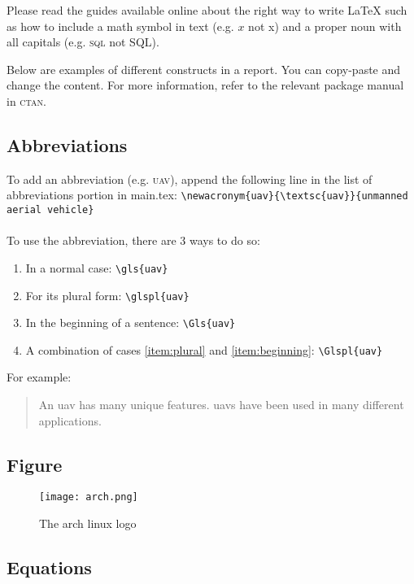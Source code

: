 \documentclass[../main.tex]{subfiles}
\begin{document}
Please read the guides available online about the right way
to write {\LaTeX} such as how to include a math symbol in
text (e.g. $x$ not x) and a proper noun with all capitals
(e.g. \textsc{sql} not SQL).

Below are examples of different constructs in a report. You
can copy-paste and change the content. For more information,
refer to the relevant package manual in \textsc{ctan}.

\subsection{Abbreviations}

To add an abbreviation (e.g. \textsc{uav}), 
append the following line 
in the list of abbreviations portion in main.tex:
\verb|\newacronym{uav}{\textsc{uav}}{unmanned aerial vehicle}|
\\\\
\noindent
To use the abbreviation, there are 3 ways to do so:
\begin{enumerate}
    \item In a normal case: \verb|\gls{uav}|
    \item\label{item:plural} For its plural form: \verb|\glspl{uav}|
    \item\label{item:beginning} In the beginning of a sentence: \verb|\Gls{uav}|
    \item A combination of cases \ref{item:plural} 
        and \ref{item:beginning}: \verb|\Glspl{uav}|
\end{enumerate}

\noindent
For example:
\begin{quotation}
    \noindent
    An \gls{uav} has many unique features. 
    \Glspl{uav} have been used in many different applications.
\end{quotation}

\subsection{Figure}

\begin{figure}[htb] 
    \centering
    \texttt{[image: arch.png]} 
    \caption{The arch linux logo} \label{fig:arch-linux} 
\end{figure}

\subsection{Equations}
\end{document}
